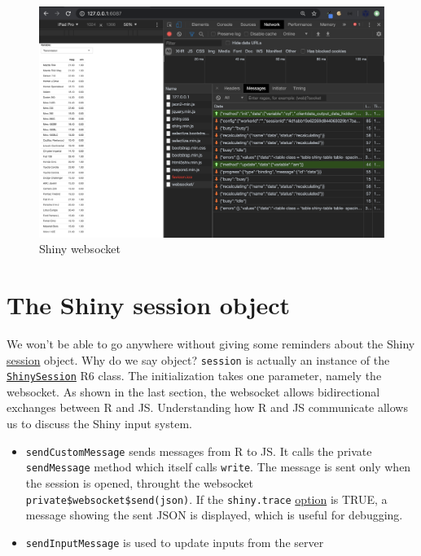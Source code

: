 \documentclass[
]{book}
\providecommand{\tightlist}{%
  \setlength{\itemsep}{0pt}\setlength{\parskip}{0pt}}
\begin{document}
\begin{figure}
\includegraphics[width=27.69in]{images/survival-kit/shiny-websocket} \caption{Shiny websocket}\label{fig:shiny-websocket}
\end{figure}

\hypertarget{shiny-session}{%
\section{The Shiny session object}\label{shiny-session}}

We won't be able to go anywhere without giving some reminders about the Shiny \href{https://shiny.rstudio.com/reference/shiny/1.4.0/session.html}{session} object. Why do we say object? \texttt{session} is actually an instance of the \href{https://github.com/rstudio/shiny/blob/master/R/shiny.R}{\texttt{ShinySession}} R6 class.
The initialization takes one parameter, namely the websocket. As shown in the last section, the websocket allows bidirectional exchanges between R and JS. Understanding how R and JS communicate allows us to discuss the Shiny input system.

\begin{itemize}
\tightlist
\item
  \texttt{sendCustomMessage} sends messages from R to JS. It calls the private \texttt{sendMessage} method which itself calls \texttt{write}. The message is sent only when the session is opened, throught the websocket \texttt{private\$websocket\$send(json)}. If the \texttt{shiny.trace} \href{https://shiny.rstudio.com/reference/shiny/0.14/shiny-options.html}{option} is TRUE, a message showing the sent JSON is displayed, which is useful for debugging.
\item
  \texttt{sendInputMessage} is used to update inputs from the server
\end{itemize}
\end{document}
